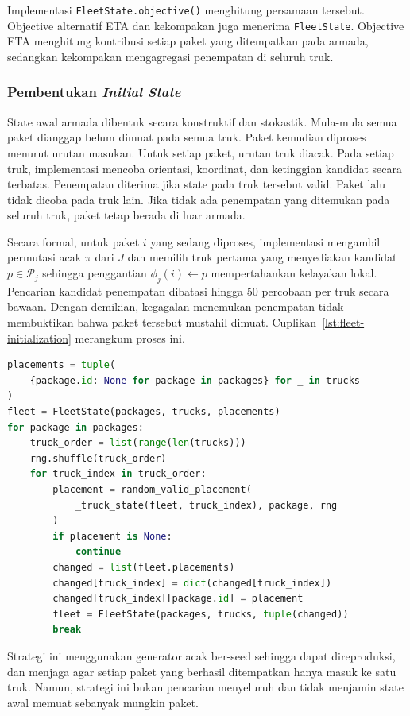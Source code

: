 Implementasi \texttt{FleetState.objective()} menghitung persamaan tersebut. Objective alternatif ETA dan kekompakan juga menerima \texttt{FleetState}. Objective ETA menghitung kontribusi setiap paket yang ditempatkan pada armada, sedangkan kekompakan mengagregasi penempatan di seluruh truk.

\subsubsection{Pembentukan \textit{Initial State}}

State awal armada dibentuk secara konstruktif dan stokastik. Mula-mula semua paket dianggap belum dimuat pada semua truk. Paket kemudian diproses menurut urutan masukan. Untuk setiap paket, urutan truk diacak. Pada setiap truk, implementasi mencoba orientasi, koordinat, dan ketinggian kandidat secara terbatas. Penempatan diterima jika state pada truk tersebut valid. Paket lalu tidak dicoba pada truk lain. Jika tidak ada penempatan yang ditemukan pada seluruh truk, paket tetap berada di luar armada.

Secara formal, untuk paket $i$ yang sedang diproses, implementasi mengambil permutasi acak $\pi$ dari $J$ dan memilih truk pertama yang menyediakan kandidat $p\in\mathcal{P}_j$ sehingga penggantian $\phi_j(i)\leftarrow p$ mempertahankan kelayakan lokal. Pencarian kandidat penempatan dibatasi hingga 50 percobaan per truk secara bawaan. Dengan demikian, kegagalan menemukan penempatan tidak membuktikan bahwa paket tersebut mustahil dimuat. Cuplikan~\ref{lst:fleet-initialization} merangkum proses ini.

\begin{lstlisting}[language=Python, caption={Inisialisasi state armada secara acak},label={lst:fleet-initialization}]
placements = tuple(
    {package.id: None for package in packages} for _ in trucks
)
fleet = FleetState(packages, trucks, placements)
for package in packages:
    truck_order = list(range(len(trucks)))
    rng.shuffle(truck_order)
    for truck_index in truck_order:
        placement = random_valid_placement(
            _truck_state(fleet, truck_index), package, rng
        )
        if placement is None:
            continue
        changed = list(fleet.placements)
        changed[truck_index] = dict(changed[truck_index])
        changed[truck_index][package.id] = placement
        fleet = FleetState(packages, trucks, tuple(changed))
        break
\end{lstlisting}

Strategi ini menggunakan generator acak ber-seed sehingga dapat direproduksi, dan menjaga agar setiap paket yang berhasil ditempatkan hanya masuk ke satu truk. Namun, strategi ini bukan pencarian menyeluruh dan tidak menjamin state awal memuat sebanyak mungkin paket.

